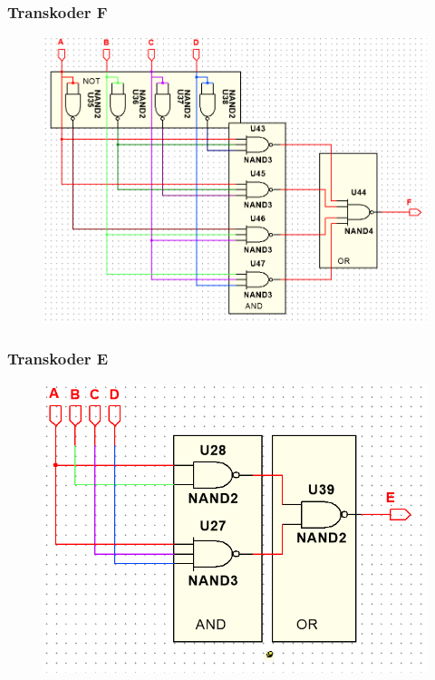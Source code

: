 \documentclass[a4paper]{article}
\begin{document}
\subsubsection{Transkoder F}
\begin{figure}[H]
 \centering
 \includegraphics[width=0.7\linewidth]{schemat_F.png}
\end{figure}

\subsubsection{Transkoder E}
\begin{figure}[H]
 \centering
 \includegraphics[width=0.7\linewidth]{schemat_E.png}
\end{figure}
\end{document}

